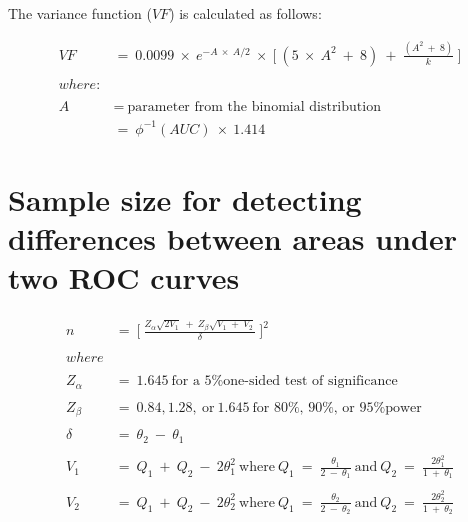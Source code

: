 \documentclass[12pt,a4paper]{article}
\theoremstyle{definition}
\theoremstyle{definition}
\theoremstyle{definition}
\theoremstyle{remark}
\begin{document}
The variance function (\(VF\)) is calculated as follows:

\[ \begin{aligned}
VF ~ & = ~ 0.0099 ~ \times ~ e ^ {-A ~ \times ~ A/2} ~ \times ~ \Bigg [ ~ (5 ~ \times ~ A ^ 2 ~ + ~ 8) ~ + ~ \frac{(A ^ 2 ~ + ~ 8)}{k} ~ \Bigg ] \\
\\
where: & \\
\\
A ~ & = ~ \text{parameter from the binomial distribution} \\
& = ~ \phi ^ {-1}(AUC) ~ \times ~ 1.414
\end{aligned}\]

\hypertarget{sample-size-for-detecting-differences-between-areas-under-two-roc-curves}{%
\section{Sample size for detecting differences between areas under two
ROC
curves}\label{sample-size-for-detecting-differences-between-areas-under-two-roc-curves}}

\[ \begin{aligned}
n ~ & = ~ \Bigg [ ~ \frac{Z_\alpha \sqrt{2 V_1} ~ + ~ Z_\beta \sqrt{V_1 ~ + ~ V_2}}{\delta} ~ \Bigg] ^ 2 \\
\\
where & \\
\\
Z_\alpha ~ & = ~ 1.645 ~ \text{for a 5\% one-sided test of significance} \\
\\
Z_\beta ~ & = ~ 0.84, 1.28, ~ \text{or} ~ 1.645 ~ \text{for 80\%, 90\%, or 95\% power} \\
\\
\delta ~ & = ~ \theta_2 ~ - ~ \theta_1 \\
\\
V_1 ~ & = ~ Q_1 ~ + ~ Q_2 ~ - ~ 2\theta_1 ^ 2 ~ \text{where} ~ Q_1 ~ = ~ \frac{\theta_1}{2 ~ - ~ \theta_1} ~ \text{and} ~ Q_2 ~ = ~ \frac{2\theta_1^2}{1 ~ + ~ \theta_1} \\
\\
V_2 ~ & = ~ Q_1 ~ + ~ Q_2 ~ - ~ 2\theta_2 ^ 2 ~ \text{where} ~ Q_1 ~ = ~ \frac{\theta_2}{2 ~ - ~ \theta_2} ~ \text{and} ~ Q_2 ~ = ~ \frac{2\theta_2^2}{1 ~ + ~ \theta_2}
\end{aligned} \]


\end{document}
